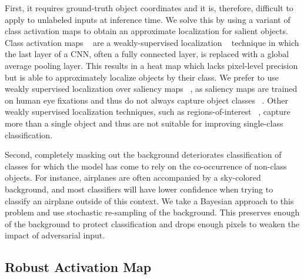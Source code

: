 First, it requires ground-truth object coordinates and it is, therefore, difficult to apply to unlabeled inputs at inference time. 
We solve this by using a variant of class activation maps to obtain an approximate localization for salient objects.
Class activation maps ~\cite{CAMZhou2016LearningDF}  are a weakly-supervised localization ~\cite{WeaklyOquab2015IsOL} technique in which
the last layer of a CNN, often a fully connected layer, is replaced with a global average pooling layer. 
This results in a heat map which lacks pixel-level precision but is able to approximately localize objects by their class.
We prefer to use weakly supervised localization over saliency maps ~\cite{SALICONHuang2015}, as saliency maps are trained on human eye fixations 
and thus do not always capture object classes ~\cite{DeepGazeKmmerer2014DeepGI}. 
Other weakly supervised localization techniques, such as regions-of-interest ~\cite{Prakash2017SemanticPI}, capture more than a single object and thus are not suitable for improving single-class classification.

Second, completely masking out the background deteriorates classification of classes for which the model has come to rely on the co-occurrence of non-class objects.
For instance, airplanes are often accompanied by a sky-colored background, and most classifiers will have lower confidence when trying to classify an airplane outside of this context.
We take a Bayesian approach to this problem and use stochastic re-sampling of the background. 
This preserves enough of the background to protect classification and drops enough pixels to weaken the impact of adversarial input. 


\subsection{Robust Activation Map \label{sec:robustmap}}

